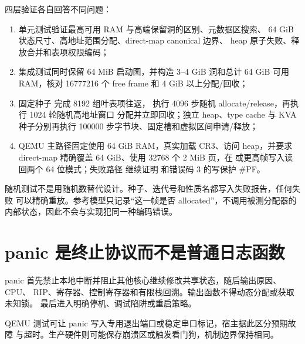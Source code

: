 四层验证各自回答不同问题：

\begin{enumerate}[label=\arabic*.]
  \item 单元测试验证最高可用 RAM 与高端保留洞的区别、元数据区搜索、
        64 GiB 状态尺寸、高地址范围分配、direct-map canonical 边界、
        heap 原子失败、释放合并和表项权限编码；
  \item 集成测试同时保留 64 MiB 启动图，并构造 3--4 GiB 洞和总计 64 GiB
        可用 RAM，核对 16777216 个 free frame 和 4 GiB 以上分配/回收；
  \item 固定种子  完成 8192 组叶表项往返，
        执行 4096 步随机 allocate/release，再执行 1024 轮随机高地址窗口
        分配并立即回收；独立 heap、type cache 与 KVA 种子分别再执行
        100000 步字节块、固定槽和虚拟区间申请/释放；
  \item QEMU 主路径固定使用 64 GiB RAM，真实加载 CR3、访问 heap，并要求
        direct-map 精确覆盖 64 GiB、使用 32768 个 2 MiB 页，在
         或更高帧写入读回两个 64 位模式；失败路径
        继续证明  和错误码 3 的写保护 \#PF。
\end{enumerate}

随机测试不是用随机数替代设计。种子、迭代号和性质名都写入失败报告，任何失败
可以精确重放。参考模型只记录“这一帧是否 allocated”，不调用被测分配器的
内部状态，因此不会与实现犯同一种编码错误。

\section{panic 是终止协议而不是普通日志函数}

panic 首先禁止本地中断并阻止其他核心继续修改共享状态，随后输出原因、CPU、
RIP、寄存器、控制寄存器和有限栈回溯。输出函数不得动态分配或获取未知锁。
最后进入明确停机、调试陷阱或重启策略。

QEMU 测试可让 panic 写入专用退出端口或稳定串口标记，宿主据此区分预期故障
与超时。生产硬件则可能保存崩溃区或触发看门狗，机制边界保持相同。
